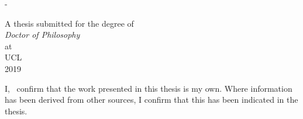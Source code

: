 
\hypersetup{pageanchor=false}
\frontmatter

\begin{titlingpage}
\SingleSpacing
\calccentering{\unitlength}
\begin{adjustwidth*}{\unitlength}{-\unitlength}
\centering
\vspace*{6cm}
{\LARGE \bfseries \thesisTitle}
\vfill
{\Large \thesisAuthor\\[2cm]}

{\large A thesis submitted for the degree of\\[0.5cm]

\textit{Doctor of Philosophy}\\[0.5cm]
at\\[0.5cm]
UCL\\[3cm]
2019}
\end{adjustwidth*}
\end{titlingpage} 
%

\hypersetup{pageanchor=true}
\pagestyle{plain}

\vspace*{3cm}
I, \thesisAuthor~confirm that the work presented in this thesis is my own.
Where information has been derived from other sources, I confirm that this has been indicated in the thesis.

\cleardoublepage

%
%

